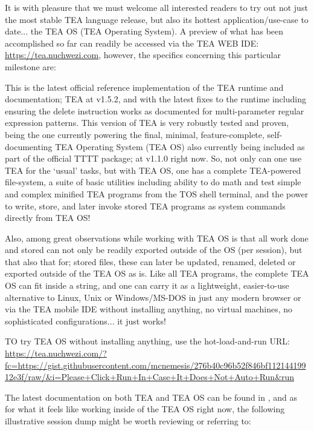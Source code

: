 \documentclass[acmtoplas]{acmart}
\begin{document}
It is with pleasure that we must welcome all interested readers to try out not just the most stable TEA language release, but also its hottest application/use-case to date... the TEA OS (TEA Operating System). A preview of what has been accomplished so far can readily be accessed via the TEA WEB IDE: \url{https://tea.nuchwezi.com}, however, the specifics concerning this particular milestone are: 

This is the latest official reference implementation of the TEA runtime and documentation; TEA at v1.5.2, and with the latest fixes to the runtime including ensuring the delete instruction works as documented for multi-parameter regular expression patterns. This version of TEA is very robustly tested and proven, being the one currently powering the final, minimal, feature-complete, self-documenting TEA Operating System (TEA OS) also currently being included as part of the official TTTT package; at v1.1.0 right now. So, not only can one use TEA for the `usual' tasks, but with TEA OS, one has a complete TEA-powered file-system, a suite of basic utilities including ability to do math and test simple and complex minified TEA programs from the TOS shell terminal, and the power to write, store, and later invoke stored TEA programs as system commands directly from TEA OS! 

Also, among great observations while working with TEA OS is that all work done and stored can not only be readily exported outside of the OS (per session), but that also that for; stored files, these can later be updated, renamed, deleted or exported outside of the TEA OS as is. Like all TEA programs, the complete TEA OS can fit inside a string, and one can carry it as a lightweight, easier-to-use alternative to Linux, Unix or Windows/MS-DOS in just any modern browser or via the TEA mobile IDE without installing anything, no virtual machines, no sophisticated configurations... it just works! 

TO try TEA OS without installing anything, use the hot-load-and-run URL: \url{https://tea.nuchwezi.com/?fc=https://gist.githubusercontent.com/mcnemesis/276b40c96b52f846bf11214419912e3f/raw/&i=Please+Click+Run+In+Case+It+Does+Not+Auto+Run&run}

The latest documentation on both TEA and TEA OS can be found in \cite{Lutalo2024TEATAZ}, and as for what it feels like working inside of the TEA OS right now, the following illustrative session dump might be worth reviewing or referring to:
\end{document}
